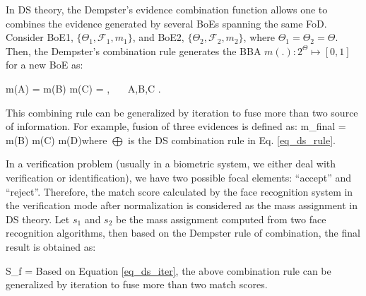 In DS theory, the Dempster's evidence combination function allows
one to combines the evidence generated by several BoEs spanning the
same FoD. Consider BoE1, $\{\Theta_1, \mathcal{F}_1, m_1\}$, and
BoE2, $\{\Theta_2,\mathcal{F}_2,m_2\}$, where $\Theta_1= \Theta_2 =
\Theta$. Then, the Dempster's combination rule generates the BBA
$m(.):2^\Theta \longmapsto [0, 1]  $ for a new BoE as:

\beq \label{eq_ds_rule} m(A) = m(B) \bigoplus m(C) =
,~~~ \forall A,B,C
\subseteq \Theta. \eeq

This combining rule can be generalized by iteration to fuse more
than two source of information. For example, fusion of three
evidences is defined as: \beq \label{eq_ds_iter} m_{final} = m(B)
\bigoplus m(C) \bigoplus m(D)\eeq where $\bigoplus$ is the DS
combination rule in Eq. \ref{eq_ds_rule}.

In a verification problem (usually in a biometric system, we either
deal with verification or identification), we have two possible
focal elements: ``accept'' and ``reject''. Therefore, the match
score calculated by the face recognition system in the verification
mode after normalization is considered as the mass assignment in DS
theory. Let $s_1$ and $s_2$ be the mass assignment computed from two
face recognition algorithms, then based on the Dempster rule of
combination, the final result is obtained as:

\beq \displaystyle S_{f} = 
\eeq Based on Equation \ref{eq_ds_iter}, the above combination rule
can be generalized by iteration to fuse more than two match scores.


